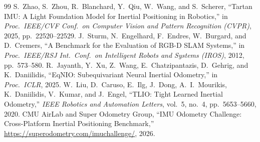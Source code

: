 \documentclass[letterpaper,10pt,conference]{ieeeconf}
\begin{document}
\begin{thebibliography}{99}
S.~Zhao, S.~Zhou, R.~Blanchard, Y.~Qiu, W.~Wang, and S.~Scherer,
``Tartan IMU: A Light Foundation Model for Inertial Positioning in Robotics,''
in \emph{Proc.\ IEEE/CVF Conf.\ on Computer Vision and Pattern Recognition (CVPR)}, 2025, pp.~22520--22529.
J.~Sturm, N.~Engelhard, F.~Endres, W.~Burgard, and D.~Cremers,
``A Benchmark for the Evaluation of RGB-D SLAM Systems,''
in \emph{Proc.\ IEEE/RSJ Int.\ Conf.\ on Intelligent Robots and Systems (IROS)}, 2012, pp.~573--580.
R.~Jayanth, Y.~Xu, Z.~Wang, E.~Chatzipantazis, D.~Gehrig, and K.~Daniilidis,
``EqNIO: Subequivariant Neural Inertial Odometry,'' in \emph{Proc.\ ICLR}, 2025.
W.~Liu, D.~Caruso, E.~Ilg, J.~Dong, A.~I.~Mourikis, K.~Daniilidis, V.~Kumar, and J.~Engel,
``TLIO: Tight Learned Inertial Odometry,'' \emph{IEEE Robotics and Automation Letters}, vol.~5, no.~4, pp.~5653--5660, 2020.
CMU AirLab and Super Odometry Group, ``IMU Odometry Challenge: Cross-Platform Inertial Positioning Benchmark,''
\url{https://superodometry.com/imuchallenge/}, 2026.
\end{thebibliography}
\end{document}
